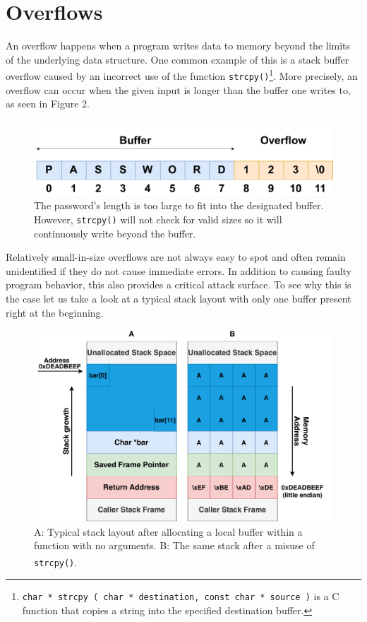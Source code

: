 \documentclass[10pt,twocolumn,a4paper]{article}
\begin{document}
\section{Overflows}\label{sec:Overflows}
An overflow happens when a program writes data to memory beyond the limits of the underlying data structure.
One common example of this is a stack buffer overflow caused by an incorrect use of the function \texttt{strcpy()}\footnote{\texttt{char * strcpy ( char * destination, const char * source )} is a C function that copies a string into the specified destination buffer.}.\newline
More precisely, an overflow can occur when the given input is longer than the buffer one writes to, as seen in Figure 2.
\begin{figure}[h]
\centering
\includegraphics[keepaspectratio,width=\linewidth,trim={0 0 0 1.5cm}]{fig/simpleoverflow}
\caption{The password's length is too large to fit into the designated buffer. However, \texttt{strcpy()} will not check for valid sizes so it will continuously write beyond the buffer.}
\end{figure}\newline
Relatively small-in-size overflows are not always easy to spot and often remain unidentified if they do not cause immediate errors.
In addition to causing faulty program behavior, this also provides a critical attack surface.
To see why this is the case let us take a look at a typical stack layout with only one buffer present right at the beginning.
\begin{figure}[h]
	\begin{center}
		\centering
		\includegraphics[keepaspectratio,width=\linewidth,trim={1cm 0 1cm 0}]{fig/Stacks}
		\caption{ A: Typical stack layout after allocating a local buffer within a function with no arguments. \newline B: The same stack after a misuse of \texttt{strcpy()}\textsuperscript{\cite{wiki}}.}
	\end{center}
\end{figure} 
\end{document}
